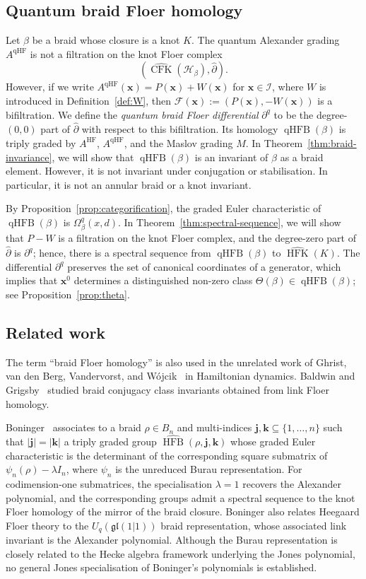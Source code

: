 \documentclass[11pt]{amsart}
\numberwithin{equation}{section}
\numberwithin{figure}{section}
\theoremstyle{definition}
\newcommand{\cF}{\mathcal{F}}
\newcommand{\cH}{\mathcal{H}}
\newcommand{\cI}{\mathcal{I}}
\newcommand{\ph}{\widehat{\partial}}
\DeclareMathOperator{\qHF}{qHF}
\DeclareMathOperator{\qHFB}{qHFB}
\DeclareMathOperator{\HFB}{HFB}
\DeclareMathOperator{\CFK}{CFK}
\newcommand{\CFKh}{\widehat{\CFK}}
\DeclareMathOperator{\HF}{HF}
\DeclareMathOperator{\HFK}{HFK}
\newcommand{\HFKh}{\widehat{\HFK}}
\newcommand{\js}{\boldsymbol{j}}
\newcommand{\ks}{\boldsymbol{k}}
\newcommand{\xs}{\boldsymbol{x}}
\begin{document}
\subsection{Quantum braid Floer homology}

Let $\beta$ be a braid whose closure is a knot $K$. The quantum Alexander grading $A^{\qHF}$ is not a filtration on the knot Floer complex 
\[
(\CFKh(\cH_\beta), \ph). 
\]
However, if we write $A^{\qHF}(\xs) = P(\xs) + W(\xs)$ for $\xs \in \cI$, where $W$ is introduced in Definition~\ref{def:W}, then $\cF(\xs) := (P(\xs), -W(\xs))$ is a bifiltration. We define the \emph{quantum braid Floer differential} $\partial^q$ to be the degree-$(0,0)$ part of $\ph$ with respect to this bifiltration. Its homology $\qHFB(\beta)$ is triply graded by $A^{\HF}$, $A^{\qHF}$, and the Maslov grading $M$. In Theorem~\ref{thm:braid-invariance}, we will show that $\qHFB(\beta)$ is an invariant of $\beta$ as a braid element. However, it is not invariant under conjugation or stabilisation. In particular, it is not an annular braid or a knot invariant. 

By Proposition~\ref{prop:categorification}, the graded Euler characteristic of $\qHFB(\beta)$ is $\Omega_\beta^q(x,d)$. In Theorem~\ref{thm:spectral-sequence}, we will show that $P - W$ is a filtration on the knot Floer complex, and the degree-zero part of $\ph$ is $\partial^q$; hence, there is a spectral sequence from $\qHFB(\beta)$ to $\HFKh(K)$. The differential $\partial^q$ preserves the set of canonical coordinates of a generator, which implies that $\xs^0$ determines a distinguished non-zero class $\Theta(\beta) \in \qHFB(\beta)$; see Proposition~\ref{prop:theta}.

\subsection{Related work} The term ``braid Floer homology'' is also used in the unrelated work of Ghrist, van den Berg, Vandervorst, and W\'ojcik~\cite{BFH} in Hamiltonian dynamics. Baldwin and Grigsby~\cite{Baldwin-Grigsby} studied braid conjugacy class invariants obtained from link Floer homology. 

Boninger~\cite{Boninger} associates to a braid $\rho \in B_n$ and multi-indices $\js, \ks \subseteq \{1, \ldots, n\}$ such that $|\js| = |\ks|$ a triply graded group $\widehat{\HFB}(\rho, \js, \ks)$ whose graded Euler characteristic is the determinant of the corresponding square submatrix of $\psi_n(\rho) - \lambda I_n$, where $\psi_n$ is the unreduced Burau representation. For codimension-one submatrices, the specialisation $\lambda = 1$ recovers the Alexander polynomial, and the corresponding groups admit a spectral sequence to the knot Floer homology of the mirror of the braid closure. Boninger also relates Heegaard Floer theory to the $U_q(\mathfrak{gl}(1|1))$ braid representation, whose associated link invariant is the Alexander polynomial. Although the Burau representation is closely related to the Hecke algebra framework underlying the Jones polynomial, no general Jones specialisation of Boninger's polynomials is established.
\end{document}
